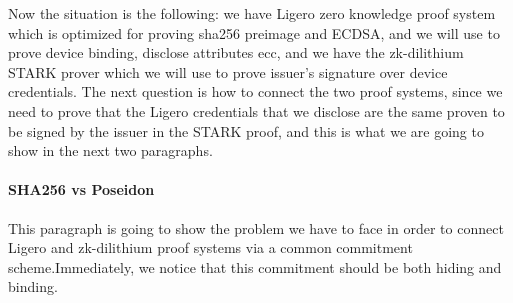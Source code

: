 \documentclass[binding=0.6cm,oneside,noexaminfo]{sapthesis}
\begin{document}
Now the situation is the following: we have Ligero zero knowledge proof system which is optimized for proving sha256 preimage
and ECDSA, and we will use to prove device binding, disclose attributes ecc, and we have the zk-dilithium STARK prover
which we will use to prove issuer's signature over device credentials. The next question is how to connect the two proof systems, 
since we need to prove that the Ligero credentials that we disclose are the same proven to be signed by the issuer in the STARK proof,
and this is what we are going to show in the next two paragraphs.

\paragraph{SHA256 vs Poseidon}
This paragraph is going to show the problem we have to face in order to connect Ligero and zk-dilithium proof systems via a 
common commitment scheme.Immediately, we notice that this commitment should be both hiding and binding.
\end{document}
